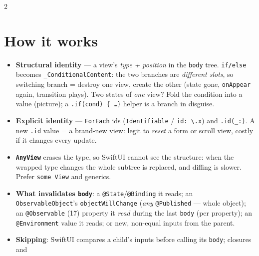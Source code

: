 \documentclass[8pt]{extarticle}
\begin{document}



\begin{multicols}{2}
\raggedright

\section{How it works}
\begin{itemize}
  \item \textbf{Structural identity} — a view's \emph{type + position} in the \texttt{body} tree.
        \texttt{if/else} becomes \texttt{\_ConditionalContent}: the two branches are \emph{different slots},
        so switching branch = destroy one view, create the other (state gone, \texttt{onAppear} again,
        transition plays). Two states of \emph{one} view? Fold the condition into a value (picture);
        a \texttt{.if(cond) \{ \ldots \}} helper is a branch in disguise.
  \item \textbf{Explicit identity} — \texttt{ForEach} ids (\texttt{Identifiable} / \texttt{id: \textbackslash.x})
        and \texttt{.id(\_:)}. A new \texttt{.id} value = a brand-new view: legit to \emph{reset} a form or
        scroll view, costly if it changes every update.
  \item \textbf{\texttt{AnyView}} erases the type, so SwiftUI cannot see the structure: when the wrapped
        type changes the whole subtree is replaced, and diffing is slower. Prefer \texttt{some View} and generics.
  \item \textbf{What invalidates \texttt{body}}: a \texttt{@State}/\texttt{@Binding} it reads; an
        \texttt{ObservableObject}'s \texttt{objectWillChange} (\emph{any} \texttt{@Published} — whole object);
        an \texttt{@Observable} (17) property it \emph{read} during the last \texttt{body} (per property);
        an \texttt{@Environment} value it reads; or new, non-equal inputs from the parent.
  \item \textbf{Skipping}: SwiftUI compares a child's inputs before calling its \texttt{body}; closures and

\end{itemize}
\end{multicols}
\end{document}
